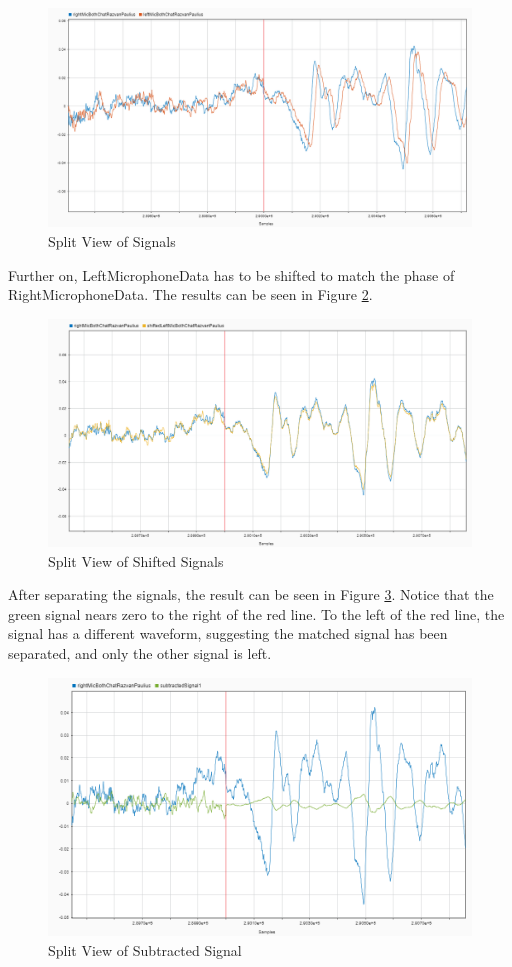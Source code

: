 \begin{figure}[htp]
	\centering
	\includegraphics[width=.9\textwidth]{Illustrations/twoSourcesAndJustOneLater.png}
	\caption{Split View of Signals}
	\label{fig:SplitTwoSources}
\end{figure}
\newpage
Further on, LeftMicrophoneData has to be shifted to match the phase of RightMicrophoneData.
The results can be seen in Figure \ref{fig:SplitShifted}.
\begin{figure}[htp]
	\centering
	\includegraphics[width=.8\textwidth]{Illustrations/shiftedLeftAndRightSplitView.png}
	\caption{Split View of Shifted Signals}
	\label{fig:SplitShifted}
\end{figure}

After separating the signals, the result can be seen in Figure \ref{fig:SplitSeparated}.
Notice that the green signal nears zero to the right of the red line. To the left of the
red line, the signal has a different waveform, suggesting the matched signal has been
separated, and only the other signal is left.

\begin{figure}[htp]
	\centering
	\includegraphics[width=.8\textwidth]{Illustrations/rightAndSubtractedSplitView.png}
	\caption{Split View of Subtracted Signal}
	\label{fig:SplitSeparated}
\end{figure}




